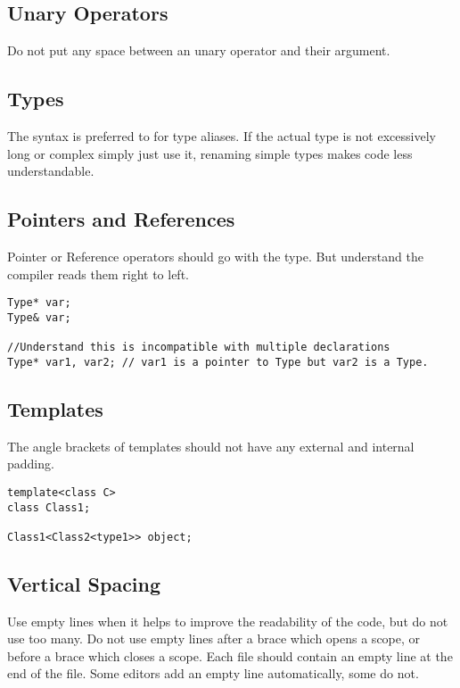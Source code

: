 \subsection{Unary Operators}
Do not put any space between an unary operator and their argument.

\subsection{Types}
The  syntax is preferred to  for type aliases.
If the actual type is not excessively long or complex simply just use it, renaming simple types makes code less understandable.

\subsection{Pointers and References}
Pointer or Reference operators should go with the type. But understand the compiler reads them right to left.

\begin{lstlisting}
Type* var;
Type& var;

//Understand this is incompatible with multiple declarations
Type* var1, var2; // var1 is a pointer to Type but var2 is a Type.
\end{lstlisting}

\subsection{Templates}
The angle brackets of templates should not have any external and internal padding.
\begin{lstlisting}
template<class C>
class Class1;

Class1<Class2<type1>> object;
\end{lstlisting}

\subsection{Vertical Spacing}
Use empty lines when it helps to improve the readability of the code, but do not use too many.
Do not use empty lines after a brace which opens a scope,
or before a brace which closes a scope.
Each file should contain an empty line at the end of the file.
Some editors add an empty line automatically, some do not.


